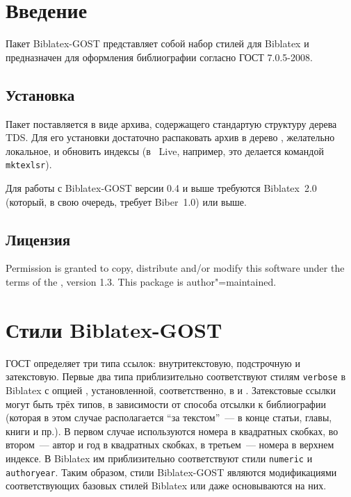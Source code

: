 \documentclass[11pt,a4paper,headings=small,numbers=enddot,english,russian]{ltxdockit}[2011/03/25]
\newcommand*{\biber}{Biber\xspace}
\newcommand*{\biblatex}{Biblatex\xspace}
\newcommand*{\biblatexgost}{\biblatex-GOST\xspace}
\newcommand*{\bibsty}{\texttt}
\newcommand*{\gostcitename}{ГОСТ 7.0.5-2008}
\begin{document}
\printtitlepage
\tableofcontents
\listoftables

\section{Введение}
\label{sec:int}

Пакет \biblatexgost{} представляет 
собой набор стилей для \biblatex{} 
и предназначен для оформления библиографии согласно \gostcitename. 

\subsection{Установка}
\label{sec:install}

Пакет поставляется в виде архива, содержащего стандартую структуру дерева TDS. 
Для его установки достаточно распаковать архив в дерево \tex, желательно локальное, и 
обновить индексы (в \tex~Live, например, это делается командой \texttt{mktexlsr}).

Для работы с \biblatexgost версии 0.4 и выше требуются 
\biblatex~2.0 (который,
в свою очередь, требует \biber~1.0) или выше.

\subsection{Лицензия}
\label{sec:lic}

Permission is granted to copy, distribute and\slash or modify this software under the terms of the \lppl, version 1.3. This package is author"=maintained.


\section{Стили \biblatexgost}
\label{sec:styles}

ГОСТ определяет три типа ссылок: внутритекстовую, подстрочную и затекстовую.
Первые два типа приблизительно соответствуют стилям \bibsty{verbose} в \biblatex 
с опцией , установленной, соответственно, в  и 
. Затекстовые ссылки могут быть трёх типов, в зависимости 
от способа отсылки к библиографии (которая в этом случае располагается 
\enquote{за текстом}~--- в конце статьи, главы, книги и пр.). 
В первом случае используются номера в квадратных скобках, во 
втором~--- автор и год в квадратных скобках, в третьем~--- номера в верхнем индексе. 
В \biblatex им приблизительно 
соответствуют стили \bibsty{numeric} и \bibsty{authoryear}. Таким образом, 
стили \biblatexgost являются модификациями соответствующих базовых стилей 
\biblatex или даже основываются на них. 
\end{document}
